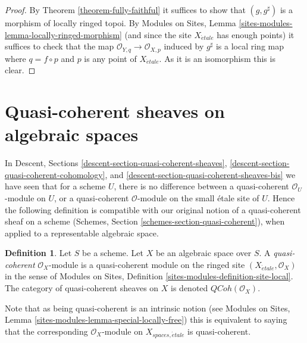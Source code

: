 \documentclass{stacks-project}
\theoremstyle{plain}
\theoremstyle{definition}
\newtheorem{definition}[subsection]{Definition}
\theoremstyle{remark}
\numberwithin{equation}{subsection}
\def\etale{{\acute{e}tale}}
\def\QCoh{\mathit{QCoh}}
\begin{document}
\begin{proof}
By
Theorem \ref{theorem-fully-faithful}
it suffices to show that $(g, g^\sharp)$ is a morphism of
locally ringed topoi. By
Modules on Sites, Lemma \ref{sites-modules-lemma-locally-ringed-morphism}
(and since the site $X_\etale$ has enough points)
it suffices to check that the map
$\mathcal{O}_{Y, q} \to \mathcal{O}_{X, p}$ induced by $g^\sharp$
is a local ring map where $q = f \circ p$ and $p$ is any point of
$X_\etale$. As it is an isomorphism this is clear.
\end{proof}














\section{Quasi-coherent sheaves on algebraic spaces}
\label{section-quasi-coherent}

\noindent
In
Descent, Sections \ref{descent-section-quasi-coherent-sheaves},
\ref{descent-section-quasi-coherent-cohomology}, and
\ref{descent-section-quasi-coherent-sheaves-bis}
we have seen that for a scheme $U$, there is no difference between a
quasi-coherent $\mathcal{O}_U$-module on $U$, or a quasi-coherent
$\mathcal{O}$-module on the small \'etale site of $U$. Hence the following
definition is compatible with our original notion of a quasi-coherent sheaf
on a scheme
(Schemes, Section \ref{schemes-section-quasi-coherent}),
when applied to a representable algebraic space.

\begin{definition}
\label{definition-quasi-coherent}
Let $S$ be a scheme. Let $X$ be an algebraic space over $S$.
A {\it quasi-coherent} $\mathcal{O}_X$-module
is a quasi-coherent module on the ringed site
$(X_\etale, \mathcal{O}_X)$ in the sense of
Modules on Sites,
Definition \ref{sites-modules-definition-site-local}.
The category of quasi-coherent sheaves on $X$ is denoted
$\QCoh(\mathcal{O}_X)$.
\end{definition}

\noindent
Note that as being quasi-coherent is an intrinsic notion (see
Modules on Sites, Lemma \ref{sites-modules-lemma-special-locally-free})
this is equivalent to saying that the corresponding $\mathcal{O}_X$-module
on $X_{spaces, \etale}$ is quasi-coherent.
\end{document}
